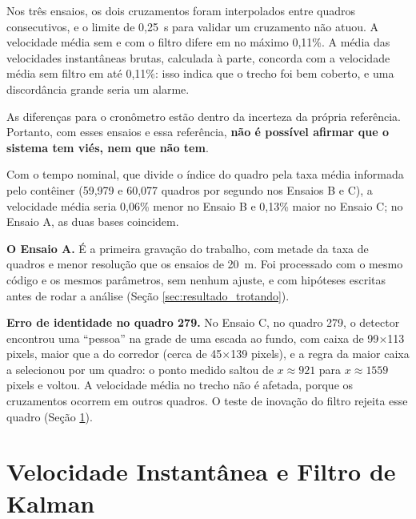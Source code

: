 \documentclass[
    12pt,               %
    openright,          %
    twoside,            %
    a4paper,            %
    chapter=TITLE,      %
    english,            %
    brazil              %
    ]{abntex2}
\begin{document}
Nos três ensaios, os dois cruzamentos foram interpolados entre quadros consecutivos, e o limite de 0,25~s para validar um cruzamento não atuou. A velocidade média sem e com o filtro difere em no máximo 0,11\%. A média das velocidades instantâneas brutas, calculada à parte, concorda com a velocidade média sem filtro em até 0,11\%: isso indica que o trecho foi bem coberto, e uma discordância grande seria um alarme.

As diferenças para o cronômetro estão dentro da incerteza da própria referência. Portanto, com esses ensaios e essa referência, \textbf{não é possível afirmar que o sistema tem viés, nem que não tem}.

Com o tempo nominal, que divide o índice do quadro pela taxa média informada pelo contêiner (59,979 e 60,077 quadros por segundo nos Ensaios B e C), a velocidade média seria 0,06\% menor no Ensaio B e 0,13\% maior no Ensaio C; no Ensaio A, as duas bases coincidem.

\textbf{O Ensaio A.} É a primeira gravação do trabalho, com metade da taxa de quadros e menor resolução que os ensaios de 20~m. Foi processado com o mesmo código e os mesmos parâmetros, sem nenhum ajuste, e com hipóteses escritas antes de rodar a análise (Seção \ref{sec:resultado_trotando}).

\textbf{Erro de identidade no quadro 279.} No Ensaio C, no quadro 279, o detector encontrou uma ``pessoa'' na grade de uma escada ao fundo, com caixa de 99$\times$113 pixels, maior que a do corredor (cerca de 45$\times$139 pixels), e a regra da maior caixa a selecionou por um quadro: o ponto medido saltou de $x \approx 921$ para $x \approx 1559$ pixels e voltou. A velocidade média no trecho não é afetada, porque os cruzamentos ocorrem em outros quadros. O teste de inovação do filtro rejeita esse quadro (Seção \ref{sec:resultado_kalman}).

\section{Velocidade Instantânea e Filtro de Kalman}
\label{sec:resultado_kalman}
\end{document}

